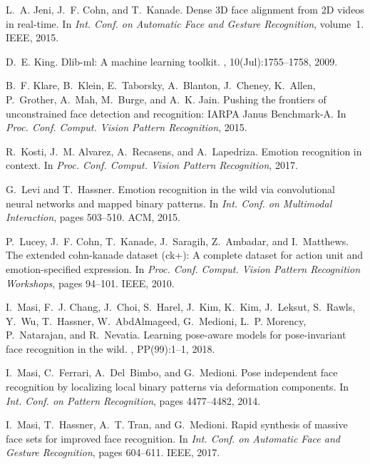 \documentclass[a4paper, 10pt, conference]{ieeeconf}
\begin{document}
{\begin{thebibliography}{10}
L.~A. Jeni, J.~F. Cohn, and T.~Kanade.
\newblock Dense {3D} face alignment from {2D} videos in real-time.
\newblock In {\em Int. Conf. on Automatic Face and Gesture Recognition},
  volume~1. IEEE, 2015.

D.~E. King.
\newblock Dlib-ml: A machine learning toolkit.
, 10(Jul):1755--1758, 2009.

B.~F. Klare, B.~Klein, E.~Taborsky, A.~Blanton, J.~Cheney, K.~Allen,
  P.~Grother, A.~Mah, M.~Burge, and A.~K. Jain.
\newblock Pushing the frontiers of unconstrained face detection and
  recognition: {IARPA} {J}anus {B}enchmark-{A}.
\newblock In {\em Proc. Conf. Comput. Vision Pattern Recognition}, 2015.

R.~Kosti, J.~M. Alvarez, A.~Recasens, and A.~Lapedriza.
\newblock Emotion recognition in context.
\newblock In {\em Proc. Conf. Comput. Vision Pattern Recognition}, 2017.

G.~Levi and T.~Hassner.
\newblock Emotion recognition in the wild via convolutional neural networks and
  mapped binary patterns.
\newblock In {\em Int. Conf. on Multimodal Interaction}, pages 503--510. ACM,
  2015.

P.~Lucey, J.~F. Cohn, T.~Kanade, J.~Saragih, Z.~Ambadar, and I.~Matthews.
\newblock The extended cohn-kanade dataset (ck+): A complete dataset for action
  unit and emotion-specified expression.
\newblock In {\em Proc. Conf. Comput. Vision Pattern Recognition Workshops},
  pages 94--101. IEEE, 2010.

I.~Masi, F.~J. Chang, J.~Choi, S.~Harel, J.~Kim, K.~Kim, J.~Leksut, S.~Rawls,
  Y.~Wu, T.~Hassner, W.~AbdAlmageed, G.~Medioni, L.~P. Morency, P.~Natarajan,
  and R.~Nevatia.
\newblock Learning pose-aware models for pose-invariant face recognition in the
  wild.
, PP(99):1--1, 2018.

I.~Masi, C.~Ferrari, A.~Del~Bimbo, and G.~Medioni.
\newblock Pose independent face recognition by localizing local binary patterns
  via deformation components.
\newblock In {\em Int. Conf. on Pattern Recognition}, pages 4477--4482, 2014.

I.~Masi, T.~Hassner, A.~T. Tran, and G.~Medioni.
\newblock Rapid synthesis of massive face sets for improved face recognition.
\newblock In {\em Int. Conf. on Automatic Face and Gesture Recognition}, pages
  604--611. IEEE, 2017.


\end{thebibliography}}
\end{document}
